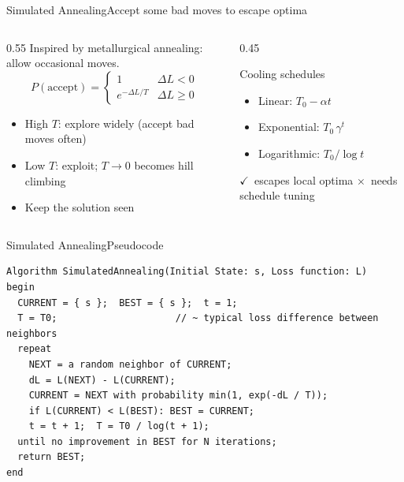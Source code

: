 \documentclass[aspectratio=169,11pt]{beamer}
\newcommand{\cmark}{\textcolor{SuccessGreen}{\ensuremath{\checkmark}}}
\newcommand{\xmark}{\textcolor{AlertRed}{\ensuremath{\times}}}
\begin{document}
\begin{frame}{Simulated Annealing}{Accept some bad moves to escape optima}
  \begin{columns}[T]
    \begin{column}{0.55\textwidth}
      Inspired by metallurgical annealing: allow occasional  moves.
      \[ P(\text{accept}) = \begin{cases} 1 & \Delta L < 0 \\ e^{-\Delta L / T} & \Delta L \ge 0 \end{cases} \]
      \begin{itemize}\small
        \item High $T$: explore widely (accept bad moves often)
        \item Low $T$: exploit; $T \to 0$ becomes hill climbing
        \item Keep the  solution seen
      \end{itemize}
    \end{column}
    \begin{column}{0.45\textwidth}
      \begin{block}{Cooling schedules}
        \small
        \begin{itemize}
          \item Linear: $T_0 - \alpha t$
          \item Exponential: $T_0\,\gamma^{t}$
          \item Logarithmic: $T_0 / \log t$
        \end{itemize}
      \end{block}
      \centering\scriptsize
      \cmark\ escapes local optima \quad \xmark\ needs schedule tuning
    \end{column}
  \end{columns}
\end{frame}

\begin{frame}[fragile]{Simulated Annealing}{Pseudocode}
\begin{lstlisting}[language={}, basicstyle=\ttfamily\scriptsize, numbers=none,
                   xleftmargin=0.5em, framexleftmargin=0.5em]
Algorithm SimulatedAnnealing(Initial State: s, Loss function: L)
begin
  CURRENT = { s };  BEST = { s };  t = 1;
  T = T0;                     // ~ typical loss difference between neighbors
  repeat
    NEXT = a random neighbor of CURRENT;
    dL = L(NEXT) - L(CURRENT);
    CURRENT = NEXT with probability min(1, exp(-dL / T));
    if L(CURRENT) < L(BEST): BEST = CURRENT;
    t = t + 1;  T = T0 / log(t + 1);
  until no improvement in BEST for N iterations;
  return BEST;
end
\end{lstlisting}
\end{frame}
\end{document}
